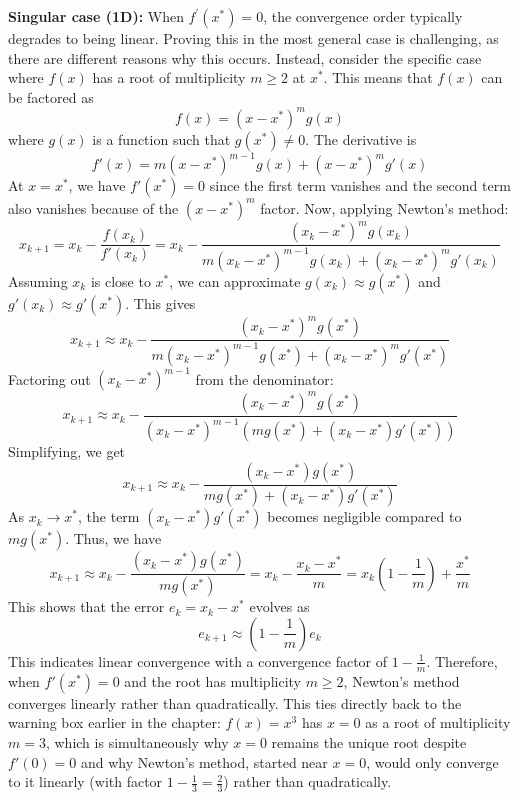 \textbf{Singular case (1D):} When $f^\prime(x^*) = 0$, the convergence order typically degrades to being linear. Proving this in the most general case is challenging, as there are different reasons why this occurs. Instead, consider the specific case where $f(x)$ has a root of multiplicity $m \ge 2$ at $x^*$. This means that $f(x)$ can be factored as
\begin{equation}
    f(x) = (x - x^*)^m g(x)
\end{equation}
where $g(x)$ is a function such that $g(x^*) \neq 0$. The derivative is
\begin{equation}
    f'(x) = m(x - x^*)^{m-1} g(x) + (x - x^*)^m g'(x)
\end{equation}
At $x = x^*$, we have $f'(x^*) = 0$ since the first term vanishes and the second term also vanishes because of the $(x - x^*)^m$ factor. Now, applying Newton's method:
\begin{equation}
    x_{k+1} = x_k - \frac{f(x_k)}{f'(x_k)} = x_k - \frac{(x_k - x^*)^m g(x_k)}{m(x_k - x^*)^{m-1} g(x_k) + (x_k - x^*)^m g'(x_k)}
\end{equation}
Assuming $x_k$ is close to $x^*$, we can approximate $g(x_k) \approx g(x^*)$ and $g'(x_k) \approx g'(x^*)$. This gives
\begin{equation}
    x_{k+1} \approx x_k - \frac{(x_k - x^*)^m g(x^*)}{m(x_k - x^*)^{m-1} g(x^*) + (x_k - x^*)^m g'(x^*)}
\end{equation}
Factoring out $(x_k - x^*)^{m-1}$ from the denominator:
\begin{equation}
    x_{k+1} \approx x_k - \frac{(x_k - x^*)^m g(x^*)}{(x_k - x^*)^{m-1} \left( m g(x^*) + (x_k - x^*) g'(x^*) \right)}
\end{equation}
Simplifying, we get
\begin{equation}
    x_{k+1} \approx x_k - \frac{(x_k - x^*) g(x^*)}{m g(x^*) + (x_k - x^*) g'(x^*)}
\end{equation}
As $x_k \to x^*$, the term $(x_k - x^*) g'(x^*)$ becomes negligible compared to $m g(x^*)$. Thus, we have
\begin{equation}
    x_{k+1} \approx x_k - \frac{(x_k - x^*) g(x^*)}{m g(x^*)} = x_k - \frac{x_k - x^*}{m} = x_k \left(1 - \frac{1}{m}\right) + \frac{x^*}{m}
\end{equation}
This shows that the error $e_k = x_k - x^*$ evolves as
\begin{equation}
    e_{k+1} \approx \left(1 - \frac{1}{m}\right) e_k
\end{equation}
This indicates linear convergence with a convergence factor of $1 - \frac{1}{m}$. Therefore, when $f'(x^*) = 0$ and the root has multiplicity $m \ge 2$, Newton's method converges linearly rather than quadratically. This ties directly back to the warning box earlier in the chapter: $f(x)=x^3$ has $x=0$ as a root of multiplicity $m=3$, which is simultaneously why $x=0$ remains the unique root despite $f'(0)=0$ and why Newton's method, started near $x=0$, would only converge to it linearly (with factor $1-\tfrac13 = \tfrac23$) rather than quadratically.

